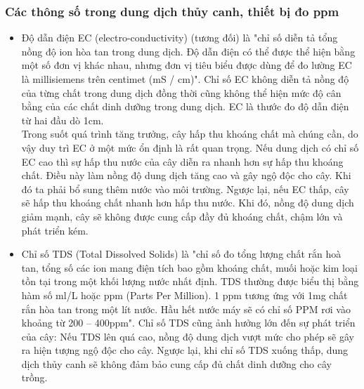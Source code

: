 \documentclass[a4paper,12pt,oneside]{article}
\begin{document}
\subsubsection{Các thông số trong dung dịch thủy canh, thiết bị đo ppm}

\begin{itemize}
\item Độ dẫn điện EC (electro-conductivity) (tương đối) là "chỉ số diễn tả tổng nồng độ ion hòa tan trong dung dịch. Độ dẫn điện có thể được thể hiện bằng một số đơn vị khác nhau, nhưng đơn vị tiêu biểu được dùng để đo lường EC là millisiemens trên centimet (mS / cm)"\cite{ec}. Chỉ số EC không diễn tả nồng độ của từng chất trong dung dịch đồng thời cũng không thể hiện mức độ cân bằng của các chất dinh dưỡng trong dung dịch. EC là thước đo độ dẫn điện từ hai đầu dò 1cm.\\
Trong suốt quá trình tăng trưởng, cây hấp thu khoáng chất mà chúng cần, do vậy duy trì EC ở một mức ổn định là rất quan trọng. Nếu dung dịch có chỉ số EC cao thì sự hấp thu nước của cây diễn ra nhanh hơn sự hấp thu khoáng chất. Điều này làm nồng độ dung dịch tăng cao và gây ngộ độc cho cây. Khi đó ta phải bổ sung thêm nước vào môi trường. Ngược lại, nếu EC thấp, cây sẽ hấp thu khoáng chất nhanh hơn hấp thu nước. Khi đó, nồng độ dung dịch giảm mạnh, cây sẽ không được cung cấp đầy đủ khoáng chất, chậm lớn và phát triển kém.

\item Chỉ số TDS (Total Dissolved Solids) là "chỉ số đo tổng lượng chất rắn hoà tan, tổng số các ion mang điện tích bao gồm khoáng chất, muối hoặc kim loại tồn tại trong một khối lượng nước nhất định. TDS thường được biểu thị bằng hàm số ml/L hoặc ppm (Parts Per Million). 1 ppm tương ứng với 1mg chất rắn hòa tan trong một lít nước. Hầu hết nước máy sẽ có chỉ số PPM rơi vào khoảng từ 200 – 400ppm"\cite{ec}. Chỉ số TDS cũng ảnh hưởng lớn đến sự phát triển của cây: Nếu TDS lên quá cao, nồng độ dung dịch vượt mức cho phép sẽ gây ra hiện tượng ngộ độc cho cây. Ngược lại, khi chỉ số TDS xuống thấp, dung dịch thủy canh sẽ không đảm bảo cung cấp đủ chất dinh dưỡng cho cây trồng.


\end{itemize}
\end{document}
